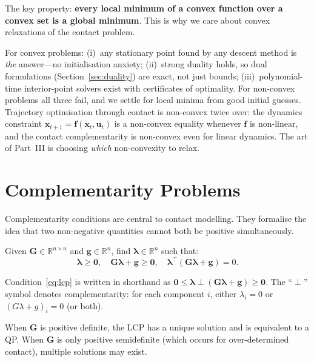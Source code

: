 \documentclass[11pt,twoside]{report}
\theoremstyle{definition}
\theoremstyle{plain}
\theoremstyle{remark}
\newcommand{\R}{\mathbb{R}}
\newcommand{\x}{\bm{x}}
\newcommand{\uu}{\bm{u}}
\newcommand{\f}{\bm{f}}
\newcommand{\0}{\bm{0}}
\begin{document}
The key property: \textbf{every local minimum of a convex function over a
convex set is a global minimum}.  This is why we care about convex
relaxations of the contact problem.

\begin{insightbox}
For convex problems: (i)~any stationary point found by any descent
method is \emph{the} answer---no initialisation anxiety;
(ii)~strong duality holds, so dual formulations (Section~\ref{sec:duality})
are exact, not just bounds; (iii)~polynomial-time interior-point solvers
exist with certificates of optimality. For non-convex problems all three
fail, and we settle for local minima from good initial guesses.
Trajectory optimisation through contact is non-convex twice over:
the dynamics constraint $\x_{t+1}=\f(\x_{t},\uu_{t})$ is a non-convex
equality whenever $\f$ is non-linear, and the contact complementarity
is non-convex even for linear dynamics. The art of Part~III is choosing
\emph{which} non-convexity to relax.
\end{insightbox}

\section{Complementarity Problems}
\label{sec:complementarity}

Complementarity conditions are central to contact modelling.
They formalise the idea that two non-negative quantities cannot
both be positive simultaneously.

\begin{definitionbox}
Given $\bm{G}\in\R^{n\times n}$ and $\bm{g}\in\R^{n}$, find $\bm{\lambda}\in\R^{n}$ such that:
\begin{equation}\label{eq:lcp}
\bm{\lambda}\ge\0,\quad
\bm{G}\bm{\lambda}+\bm{g}\ge\0,\quad
\bm{\lambda}^{\!\top}(\bm{G}\bm{\lambda}+\bm{g})=0.
\end{equation}
\end{definitionbox}

Condition~\eqref{eq:lcp} is written in shorthand as
$\0\le\bm{\lambda}\perp(\bm{G}\bm{\lambda}+\bm{g})\ge\0$.
The ``$\perp$'' symbol denotes complementarity: for each component $i$,
either $\lambda_{i}=0$ or $(G\lambda+g)_{i}=0$ (or both).

When $\bm{G}$ is positive definite, the LCP has a unique solution and
is equivalent to a QP.  When $\bm{G}$ is only positive semidefinite
(which occurs for over-determined contact), multiple solutions may exist.
\end{document}
